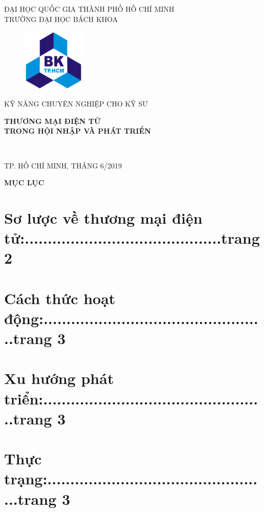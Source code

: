\documentclass[13pt,a4paper]{article}
\begin{document}
\begin{titlepage}
\begin{center}
ĐẠI HỌC QUỐC GIA THÀNH PHỐ HỒ CHÍ MINH \\
TRƯỜNG ĐẠI HỌC BÁCH KHOA \\
\end{center}

\vspace{1cm}

\begin{figure}[h!]
\begin{center}
\includegraphics[width=3cm]{images/hcmut.png}
\end{center}
\end{figure}

\vspace{1cm}


\large{KỸ NĂNG CHUYÊN NGHIỆP CHO KỸ SƯ}
\hline
\begin{center}
\textbf{{\huge THƯƠNG MẠI ĐIỆN TỬ}} \\
\textbf{{\huge TRONG HỘI NHẬP VÀ PHÁT TRIỂN}}
\end{center}
\\
\hline
\begin{center}
{\footnotesize TP. HỒ CHÍ MINH, THÁNG 6/2019}
\end{center}
\end{titlepage}

\Huge{\textbf{MỤC LỤC}}
\fontsize{13pt}{1.2cm}\selectfont
\section{Sơ lược về thương mại điện tử:...........................................trang 2 }
\section{Cách thức hoạt động:.................................................trang 3}
\section{Xu hướng phát triển:.................................................trang 3}
\section{Thực trạng:.................................................trang 3}
\end{document}
